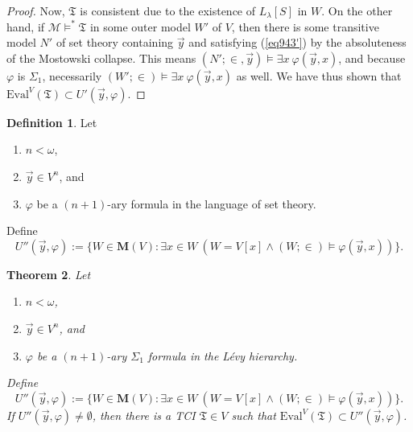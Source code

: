 \documentclass[12pt, twoside]{memoir}
\numberwithin{equation}{section}
\newtheorem{thm}{Theorem}[section]
\theoremstyle{definition}
\newtheorem{defi}[thm]{Definition}
\theoremstyle{remark}
\theoremstyle{definition}
\theoremstyle{definition}
\theoremstyle{definition}
\theoremstyle{remark}
\begin{document}
\begin{proof}
Now, $\mathfrak{T}$ is consistent due to the existence of $L_{\lambda}[S]$ in $W$. On the other hand, if $\mathcal{M} \models^* \mathfrak{T}$ in some outer model $W'$ of $V$, then there is some transitive model $N'$ of set theory containing $\Vec{y}$ and satisfying (\ref{eq943'}) by the absoluteness of the Mostowski collapse. This means $(N'; \in, \Vec{y}) \models \exists x \ \varphi (\Vec{y}, x)$, and because $\varphi$ is $\Sigma_1$, necessarily $(W'; \in) \models \exists x \ \varphi (\Vec{y}, x)$ as well. We have thus shown that $\mathrm{Eval}^V(\mathfrak{T}) \subset U'(\Vec{y}, \varphi)$.
\end{proof}

\begin{defi}
Let 
\begin{enumerate}[label=(\alph*)]
    \item $n < \omega$,
    \item $\Vec{y} \in V^n$, and
    \item $\varphi$ be a $(n + 1)$-ary formula in the language of set theory.
\end{enumerate}
Define 
\begin{equation*}
    U''(\Vec{y}, \varphi) := \{W \in \mathbf{M}(V) : \exists x \in W \ (W = V[x] \wedge (W; \in) \models \varphi (\Vec{y}, x))\} \text{.}
\end{equation*}
\end{defi}

\begin{thm}\label{thm9420}
Let 
\begin{enumerate}[label=(\alph*)]
    \item $n < \omega$,
    \item $\Vec{y} \in V^n$, and
    \item $\varphi$ be a $(n + 1)$-ary $\Sigma_1$ formula in the L\'{e}vy hierarchy.
\end{enumerate}
Define 
\begin{equation*}
    U''(\Vec{y}, \varphi) := \{W \in \mathbf{M}(V) : \exists x \in W \ (W = V[x] \wedge (W; \in) \models \varphi (\Vec{y}, x))\} \text{.}
\end{equation*}
If $U''(\Vec{y}, \varphi) \neq \emptyset$, then there is a TCI $\mathfrak{T} \in V$ such that $\mathrm{Eval}^V(\mathfrak{T}) \subset U''(\Vec{y}, \varphi)$. 
\end{thm}
\end{document}

